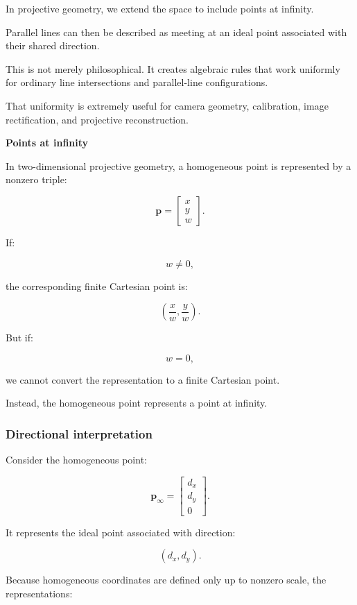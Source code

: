 In projective geometry, we extend the space to include points at infinity.

Parallel lines can then be described as meeting at an ideal point associated with their shared direction.

This is not merely philosophical. It creates algebraic rules that work uniformly for ordinary line intersections and parallel-line configurations.

That uniformity is extremely useful for camera geometry, calibration, image rectification, and projective reconstruction.

\textbf{Points at infinity}

In two-dimensional projective geometry, a homogeneous point is represented by a nonzero triple:

\[
 \boxed{ \mathbf p= \begin{bmatrix} x\\y\\w \end{bmatrix} }.
\]

If:

\[
 w\ne0,
\]

the corresponding finite Cartesian point is:

\[
 \boxed{ \left(\frac xw,\frac yw\right) }.
\]

But if:

\[
 \boxed{w=0},
\]

we cannot convert the representation to a finite Cartesian point.

Instead, the homogeneous point represents a point at infinity.

\subsubsection{Directional interpretation}\label{directional-interpretation}

Consider the homogeneous point:

\[
 \boxed{ \mathbf p_\infty= \begin{bmatrix} d_x\\d_y\\0 \end{bmatrix} }.
\]

It represents the ideal point associated with direction:

\[
 (d_x,d_y).
\]

Because homogeneous coordinates are defined only up to nonzero scale, the representations:

